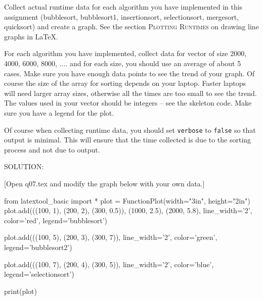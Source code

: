 Collect actual runtime data for each algorithm you have implemented in this
assignment
(bubblesort, bubblesort1, insertionsort, selectionsort,
mergesort, quicksort)
and create a graph.
See the section \textsc{Plotting Runtimes}
on drawing line graphs in \LaTeX.

For each algorithm you have implemented, collect data for 
vector of size 2000, 4000, 6000, 8000, ....
and for each size, you should use an average of about 5 cases.
Make sure you have enough data points to see the trend of your graph.
Of course the size of the array for sorting depends on your laptop.
Faster laptops will need larger array sizes, otherwise all the times
are too small to see the trend.
The values used in your vector should be integers --
see the skeleton code.
Make sure you have a legend for the plot.

Of course when collecting runtime data, you should set
\verb!verbose! to \verb!false! so that output is minimal.
This will ensure that the time collected is due to the sorting process
and not due to output.

SOLUTION:

[Open q07.tex and modify the graph below with your own data.]
\begin{python}
from latextool_basic import *
plot = FunctionPlot(width="3in", height="2in")
plot.add(((100, 1),
          (200, 2),
          (300, 0.5)),
          (1000, 2.5),
          (2000, 5.8),
          line_width='2', color='red', legend='bubblesort')

plot.add(((100, 5),
          (200, 3),
          (300, 7)),
          line_width='2', color='green', legend='bubblesort2')

plot.add(((100, 7),
          (200, 4),
          (300, 5)),
          line_width='2', color='blue', legend='selectionsort')
          
print(plot)
\end{python}

